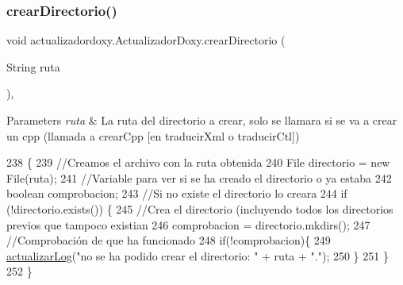 \subsubsection{\texorpdfstring{crear\+Directorio()}{crearDirectorio()}}
{\footnotesize\ttfamily void actualizadordoxy.\+Actualizador\+Doxy.\+crear\+Directorio (\begin{DoxyParamCaption}\item[{String}]{ruta }\end{DoxyParamCaption})\hspace{0.3cm}{\ttfamily [inline]}, {\ttfamily [private]}}


\begin{DoxyParams}{Parameters}
{\em ruta} & La ruta del directorio a crear, solo se llamara si se va a crear un cpp (llamada a crear\+Cpp \mbox{[}en traducir\+Xml o traducir\+Ctl\mbox{]}) \\
\hline
\end{DoxyParams}

\begin{DoxyCode}
238                                              \{
239         \textcolor{comment}{//Creamos el archivo con la ruta obtenida}
240         File directorio = \textcolor{keyword}{new} File(ruta);
241         \textcolor{comment}{//Variable para ver si se ha creado el directorio o ya estaba}
242         \textcolor{keywordtype}{boolean} comprobacion;
243         \textcolor{comment}{//Si no existe el directorio lo creara}
244         \textcolor{keywordflow}{if} (!directorio.exists()) \{
245             \textcolor{comment}{//Crea el directorio (incluyendo todos los directorios previos que tampoco existian}
246             comprobacion = directorio.mkdirs();
247             \textcolor{comment}{//Comprobación de que ha funcionado}
248             \textcolor{keywordflow}{if}(!comprobacion)\{
249                 \mbox{\hyperlink{classactualizadordoxy_1_1_actualizador_doxy_a1ad41046efbaaf40a60b34da347f9090}{actualizarLog}}(\textcolor{stringliteral}{"no se ha podido crear el directorio: "} + ruta + \textcolor{stringliteral}{"."});
250             \}
251         \}        
252     \}
\end{DoxyCode}
\mbox{\label{classactualizadordoxy_1_1_actualizador_doxy_ad31b85897c4caa3b43291e89f88ca417}} 
